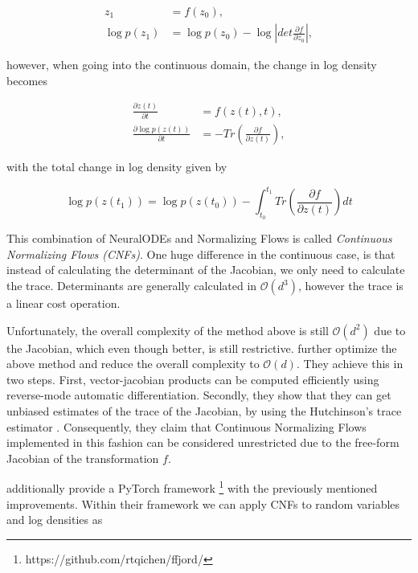 \begin{align}
    z_{1} &= f(z_{0}), \\
    \log p(z_{1}) &= \log p(z_{0}) - \log \left \lvert det \frac{\partial f}{\partial z_{0}} \right \rvert,
\end{align}

however, when going into the continuous domain, the change in log density becomes

\begin{align}
    \frac{\partial z(t)}{\partial t} &= f(z(t), t), \\
    \frac {\partial \log p(z(t))} {\partial t} &= -Tr \left( \frac{\partial f}{\partial z(t)} \right),
\end{align}

with the total change in log density given by

\begin{displaymath}
    \log p(z(t_1)) = \log p(z(t_0)) - \int_{t_0}^{t_1} Tr \left( \frac{\partial f}{\partial z(t)} \right) dt    
\end{displaymath}

This combination of NeuralODEs and Normalizing Flows is called \emph{Continuous Normalizing Flows (CNFs)}. One huge difference in the continuous case, is that instead of calculating the determinant of the Jacobian, we only need to calculate the trace. Determinants are generally calculated in $ \mathcal{O}(d^3) $, however the trace is a linear cost operation.

Unfortunately, the overall complexity of the method above is still $ \mathcal{O}(d^2) $ due to the Jacobian, which even though better, is still restrictive. \citet{grathwohl2018ffjord} further optimize the above method and reduce the overall complexity to $ \mathcal{O}(d) $. They achieve this in two steps. First, vector-jacobian products can be computed efficiently using reverse-mode automatic differentiation. Secondly, they show that they can get unbiased estimates of the trace of the Jacobian, by using the Hutchinson’s trace estimator \citep{hutchinson1990stochastic}. Consequently, they claim that Continuous Normalizing Flows implemented in this fashion can be considered unrestricted due to the free-form Jacobian of the transformation $ f $.

\citet{grathwohl2018ffjord} additionally provide a PyTorch framework \footnote{https://github.com/rtqichen/ffjord/} with the previously mentioned improvements. Within their framework we can apply CNFs to random variables and log densities as

